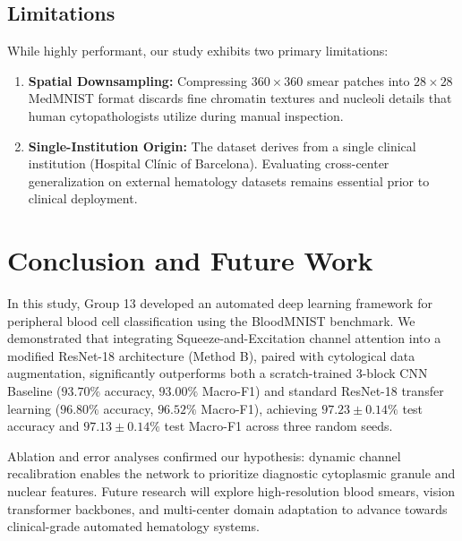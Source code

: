 \documentclass[conference]{IEEEtran}
\begin{document}
\subsection{Limitations}
While highly performant, our study exhibits two primary limitations:
\begin{enumerate}
    \item \textbf{Spatial Downsampling:} Compressing $360 \times 360$ smear patches into $28 \times 28$ MedMNIST format discards fine chromatin textures and nucleoli details that human cytopathologists utilize during manual inspection.
    \item \textbf{Single-Institution Origin:} The dataset derives from a single clinical institution (Hospital Cl\'{i}nic of Barcelona). Evaluating cross-center generalization on external hematology datasets remains essential prior to clinical deployment.
\end{enumerate}

\section{Conclusion and Future Work}
In this study, Group 13 developed an automated deep learning framework for peripheral blood cell classification using the BloodMNIST benchmark. We demonstrated that integrating Squeeze-and-Excitation channel attention into a modified ResNet-18 architecture (Method B), paired with cytological data augmentation, significantly outperforms both a scratch-trained 3-block CNN Baseline ($93.70\%$ accuracy, $93.00\%$ Macro-F1) and standard ResNet-18 transfer learning ($96.80\%$ accuracy, $96.52\%$ Macro-F1), achieving $\mathbf{97.23 \pm 0.14\%}$ test accuracy and $\mathbf{97.13 \pm 0.14\%}$ test Macro-F1 across three random seeds.

Ablation and error analyses confirmed our hypothesis: dynamic channel recalibration enables the network to prioritize diagnostic cytoplasmic granule and nuclear features. Future research will explore high-resolution blood smears, vision transformer backbones, and multi-center domain adaptation to advance towards clinical-grade automated hematology systems.




\appendices
\end{document}
